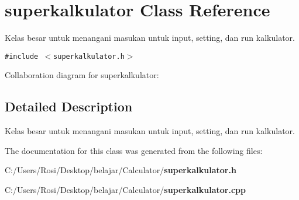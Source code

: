 \section{superkalkulator Class Reference}
\label{classsuperkalkulator}
Kelas besar untuk menangani masukan untuk input, setting, dan run kalkulator.  


{\tt \#include $<$superkalkulator.h$>$}

Collaboration diagram for superkalkulator:

\subsection{Detailed Description}
Kelas besar untuk menangani masukan untuk input, setting, dan run kalkulator. 



The documentation for this class was generated from the following files:\begin{CompactItemize}
\item 
C:/Users/Rosi/Desktop/belajar/Calculator/{\bf superkalkulator.h}\item 
C:/Users/Rosi/Desktop/belajar/Calculator/{\bf superkalkulator.cpp}\end{CompactItemize}
